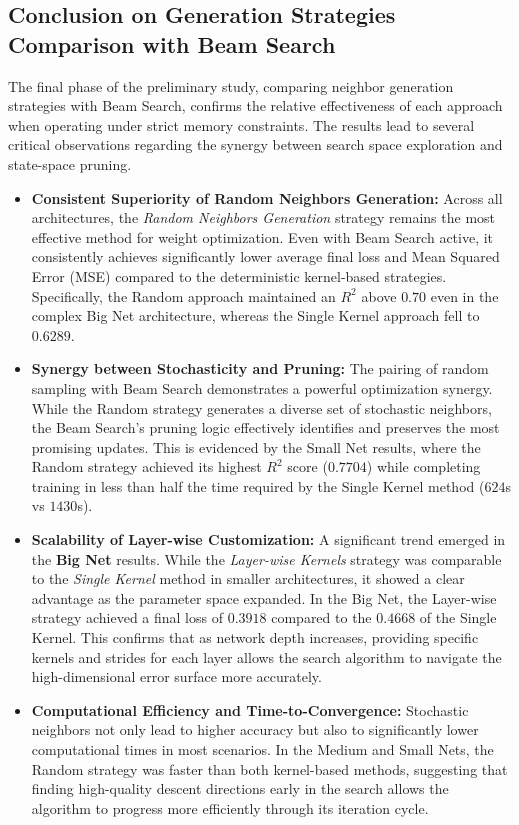 \newpage

\subsection{Conclusion on Generation Strategies Comparison with Beam Search}

The final phase of the preliminary study, comparing neighbor generation strategies with Beam Search, confirms the relative effectiveness of each approach when operating under strict memory constraints. The results lead to several critical observations regarding the synergy between search space exploration and state-space pruning.

\begin{itemize}
    \item \textbf{Consistent Superiority of Random Neighbors Generation:} Across all architectures, the \textit{Random Neighbors Generation} strategy remains the most effective method for weight optimization. Even with Beam Search active, it consistently achieves significantly lower average final loss and Mean Squared Error (MSE) compared to the deterministic kernel-based strategies. Specifically, the Random approach maintained an $R^2$ above $0.70$ even in the complex Big Net architecture, whereas the Single Kernel approach fell to $0.6289$.
    
    \item \textbf{Synergy between Stochasticity and Pruning:} The pairing of random sampling with Beam Search demonstrates a powerful optimization synergy. While the Random strategy generates a diverse set of stochastic neighbors, the Beam Search's pruning logic effectively identifies and preserves the most promising updates. This is evidenced by the Small Net results, where the Random strategy achieved its highest $R^2$ score ($0.7704$) while completing training in less than half the time required by the Single Kernel method ($624$s vs $1430$s).
    
    \item \textbf{Scalability of Layer-wise Customization:} A significant trend emerged in the \textbf{Big Net} results. While the \textit{Layer-wise Kernels} strategy was comparable to the \textit{Single Kernel} method in smaller architectures, it showed a clear advantage as the parameter space expanded. In the Big Net, the Layer-wise strategy achieved a final loss of $0.3918$ compared to the $0.4668$ of the Single Kernel. This confirms that as network depth increases, providing specific kernels and strides for each layer allows the search algorithm to navigate the high-dimensional error surface more accurately.
    
    \item \textbf{Computational Efficiency and Time-to-Convergence:} Stochastic neighbors not only lead to higher accuracy but also to significantly lower computational times in most scenarios. In the Medium and Small Nets, the Random strategy was faster than both kernel-based methods, suggesting that finding high-quality descent directions early in the search allows the algorithm to progress more efficiently through its iteration cycle.
\end{itemize}

